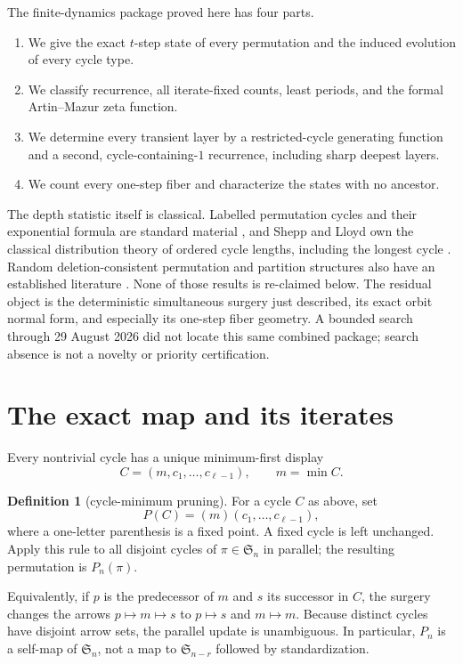 \documentclass[11pt,a4paper]{amsart}
\theoremstyle{definition}
\newtheorem{definition}[theorem]{Definition}
\theoremstyle{remark}
\newcommand{\Sn}{\mathfrak S_n}
\begin{document}
The finite-dynamics package proved here has four parts.
\begin{enumerate}
\item We give the exact $t$-step state of every permutation and the induced
  evolution of every cycle type.
\item We classify recurrence, all iterate-fixed counts, least periods, and
  the formal Artin--Mazur zeta function.
\item We determine every transient layer by a restricted-cycle generating
  function and a second, cycle-containing-$1$ recurrence, including sharp
  deepest layers.
\item We count every one-step fiber and characterize the states with no
  ancestor.
\end{enumerate}

The depth statistic itself is classical.  Labelled permutation cycles and
their exponential formula are standard material
\cite{FlajoletSedgewick2009,Stanley2011}, and Shepp and Lloyd own the
classical distribution theory of ordered cycle lengths, including the
longest cycle \cite{SheppLloyd1966}.  Random deletion-consistent permutation
and partition structures also have an established literature
\cite{Pitman2006}.  None of those results is re-claimed below.  The residual
object is the deterministic simultaneous surgery just described, its exact
orbit normal form, and especially its one-step fiber geometry.  A bounded
search through 29 August 2026 did not locate this same combined package;
search absence is not a novelty or priority certification.

\section{The exact map and its iterates}\label{sec:map}

Every nontrivial cycle has a unique minimum-first display
\[
 C=(m,c_1,\ldots,c_{\ell-1}),\qquad m=\min C.
\]

\begin{definition}[cycle-minimum pruning]\label{def:map}
For a cycle $C$ as above, set
\[
 P(C)=(m)(c_1,\ldots,c_{\ell-1}),
\]
where a one-letter parenthesis is a fixed point.  A fixed cycle is left
unchanged.  Apply this rule to all disjoint cycles of $\pi\in\Sn$ in
parallel; the resulting permutation is $P_n(\pi)$.
\end{definition}

Equivalently, if $p$ is the predecessor of $m$ and $s$ its successor in
$C$, the surgery changes the arrows $p\mapsto m\mapsto s$ to
$p\mapsto s$ and $m\mapsto m$.  Because distinct cycles have disjoint arrow
sets, the parallel update is unambiguous.  In particular, $P_n$ is a
self-map of $\Sn$, not a map to $\mathfrak S_{n-r}$ followed by
standardization.
\end{document}
